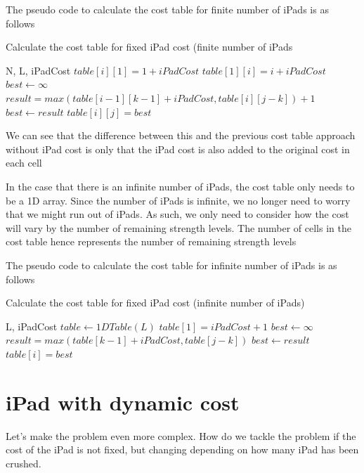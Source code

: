 \documentclass[12pt,a4paper,oneside]{report}
\begin{document}
The pseudo code to calculate the cost table for finite number of iPads is as follows

\begin{algorithm}[H]
\caption{Calculate the cost table for fixed iPad cost (finite number of iPads}
\begin{algorithmic}[1]
\REQUIRE N, L, iPadCost
	\STATE $table[i][1] = 1+iPadCost$
\ENDFOR
{}
	\STATE $table[1][i] = i+iPadCost$
\ENDFOR
{}
		\STATE $best \leftarrow \infty$
			\STATE $result = max(table[i - 1][k - 1]+iPadCost, table[i][j - k]) + 1$
				\STATE $best \leftarrow result$
			\ENDIF
		\ENDFOR
		\STATE $table[i][j] = best$
	\ENDFOR
\ENDFOR
\end{algorithmic}
\end{algorithm}

We can see that the difference between this and the previous cost table approach without iPad cost is only that the iPad cost is also added to the original cost in each cell

In the case that there is an infinite number of iPads, the cost table only needs to be a 1D array. Since the number of iPads is infinite, we no longer need to worry that we might run out of iPads. As such, we only need to consider how the cost will vary by the number of remaining strength levels. The number of cells in the cost table hence represents the number of remaining strength levels

The pseudo code to calculate the cost table for infinite number of iPads is as follows

\begin{algorithm}[H]
\caption{Calculate the cost table for fixed iPad cost (infinite number of iPads)}
\begin{algorithmic}[1]
\REQUIRE L, iPadCost
\STATE $table \leftarrow 1DTable(L)$
\STATE $table[1] = iPadCost+1$
	\STATE $best \leftarrow \infty$
		\STATE $result = max(table[k - 1] + iPadCost, table[j - k])$
			\STATE $best \leftarrow result$
		\ENDIF
	\ENDFOR
	\STATE $table[i] = best$
\ENDFOR
\end{algorithmic}
\end{algorithm}

\section{iPad with dynamic cost}
Let's make the problem even more complex. How do we tackle the problem if the cost of the iPad is not fixed, but changing depending on how many iPad has been crushed. 
\end{document}
